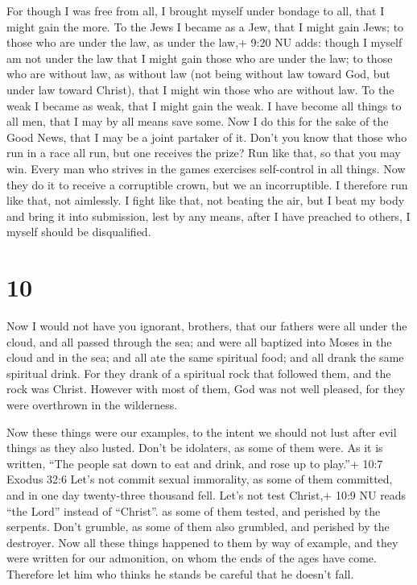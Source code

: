  For though I was free from all, I brought myself under
bondage to all, that I might gain the more.  To the Jews I
became as a Jew, that I might gain Jews; to those who are under the law,
as under the law,+ 9:20 NU adds: though I myself am not under the law
that I might gain those who are under the law;  to those
who are without law, as without law (not being without law toward God,
but under law toward Christ), that I might win those who are without
law.  To the weak I became as weak, that I might gain the
weak. I have become all things to all men, that I may by all means save
some.  Now I do this for the sake of the Good News, that I
may be a joint partaker of it.  Don't you know that those
who run in a race all run, but one receives the prize? Run like that, so
that you may win.  Every man who strives in the games
exercises self-control in all things. Now they do it to receive a
corruptible crown, but we an incorruptible.  I therefore
run like that, not aimlessly. I fight like that, not beating the air,
 but I beat my body and bring it into submission, lest by
any means, after I have preached to others, I myself should be
disqualified.

\hypertarget{section-9}{%
\section{10}\label{section-9}}

 Now I would not have you ignorant, brothers, that our
fathers were all under the cloud, and all passed through the sea;
 and were all baptized into Moses in the cloud and in the
sea;  and all ate the same spiritual food;  and
all drank the same spiritual drink. For they drank of a spiritual rock
that followed them, and the rock was Christ.  However with
most of them, God was not well pleased, for they were overthrown in the
wilderness.

 Now these things were our examples, to the intent we should
not lust after evil things as they also lusted.  Don't be
idolaters, as some of them were. As it is written, ``The people sat down
to eat and drink, and rose up to play.''+ 10:7 Exodus 32:6 
Let's not commit sexual immorality, as some of them committed, and in
one day twenty-three thousand fell.  Let's not test Christ,+
10:9 NU reads ``the Lord'' instead of ``Christ''. as some of them
tested, and perished by the serpents.  Don't grumble, as
some of them also grumbled, and perished by the destroyer. 
Now all these things happened to them by way of example, and they were
written for our admonition, on whom the ends of the ages have come.
 Therefore let him who thinks he stands be careful that he
doesn't fall.


